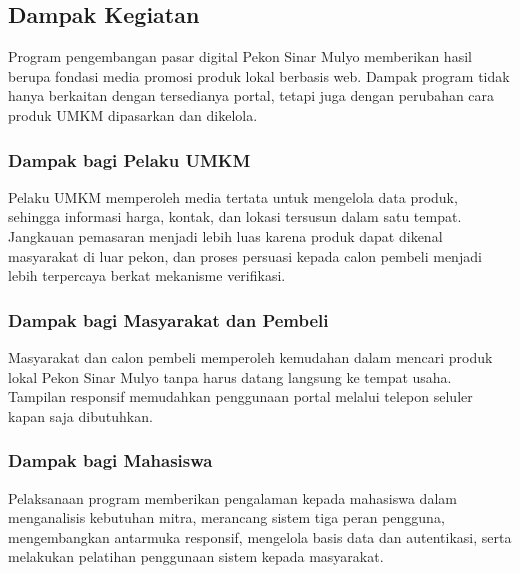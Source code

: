\documentclass[12pt,a4paper]{article}
\begin{document}
\subsection{Dampak Kegiatan}

Program pengembangan pasar digital Pekon Sinar Mulyo memberikan
hasil berupa fondasi media promosi produk lokal berbasis web.
Dampak program tidak hanya berkaitan dengan tersedianya portal,
tetapi juga dengan perubahan cara produk UMKM dipasarkan dan
dikelola.


\subsubsection{Dampak bagi Pelaku UMKM}

Pelaku UMKM memperoleh media tertata untuk mengelola data produk,
sehingga informasi harga, kontak, dan lokasi tersusun dalam satu
tempat. Jangkauan pemasaran menjadi lebih luas karena produk dapat
dikenal masyarakat di luar pekon, dan proses persuasi kepada calon
pembeli menjadi lebih terpercaya berkat mekanisme verifikasi.


\subsubsection{Dampak bagi Masyarakat dan Pembeli}

Masyarakat dan calon pembeli memperoleh kemudahan dalam mencari
produk lokal Pekon Sinar Mulyo tanpa harus datang langsung ke tempat
usaha. Tampilan responsif memudahkan penggunaan portal melalui
telepon seluler kapan saja dibutuhkan.


\subsubsection{Dampak bagi Mahasiswa}

Pelaksanaan program memberikan pengalaman kepada mahasiswa dalam
menganalisis kebutuhan mitra, merancang sistem tiga peran pengguna,
mengembangkan antarmuka responsif, mengelola basis data dan
autentikasi, serta melakukan pelatihan penggunaan sistem kepada
masyarakat.

\clearpage
\end{document}
